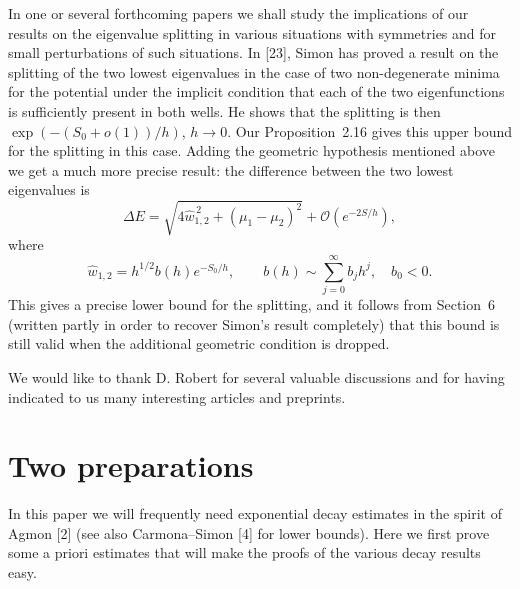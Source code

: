 \documentclass[11pt,a4paper]{article}
\newcommand{\cO}{\mathcal O}
\numberwithin{equation}{section}
\theoremstyle{remark}
\begin{document}
In one or several forthcoming papers we shall study the implications of our results on the eigenvalue splitting in various situations with symmetries and for small perturbations of such situations. In [23], Simon has proved a result on the splitting of the two lowest eigenvalues in the case of two non-degenerate minima for the potential under the implicit condition that each of the two eigenfunctions is sufficiently present in both wells. He shows that the splitting is then $\exp(-(S_0+o(1))/h)$, $h\to0$. Our Proposition~2.16 gives this upper bound for the splitting in this case. Adding the geometric hypothesis mentioned above we get a much more precise result: the difference between the two lowest eigenvalues is
\[
\Delta E=\sqrt{4\widehat w_{1,2}^{\,2}+(\mu_1-\mu_2)^2}+\cO(e^{-2S/h}),
\]
where
\[
\widehat w_{1,2}=h^{1/2}b(h)e^{-S_0/h},
\qquad
b(h)\sim\sum_{j=0}^{\infty}b_jh^j,\quad b_0<0.
\]
This gives a precise lower bound for the splitting, and it follows from Section~6 (written partly in order to recover Simon's result completely) that this bound is still valid when the additional geometric condition is dropped.

We would like to thank D. Robert for several valuable discussions and for having indicated to us many interesting articles and preprints.

\section{Two preparations}
In this paper we will frequently need exponential decay estimates in the spirit of Agmon [2] (see also Carmona--Simon [4] for lower bounds). Here we first prove some a priori estimates that will make the proofs of the various decay results easy.
\end{document}
